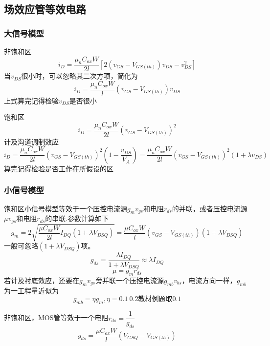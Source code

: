 \documentclass{ctexart}
\begin{document}
\subsection{场效应管等效电路}
\subsubsection{大信号模型}
非饱和区
\begin{equation}
    i_D=\dfrac{\mu_n C_{ox} W}{2l}[2(v_{GS}-V_{GS(th)})v_{DS}-v_{DS}^2]
\end{equation}
当$v_{DS}$很小时，可以忽略其二次方项，简化为
\begin{equation}
    i_D=\dfrac{\mu_n C_{ox} W}{l}(v_{GS}-V_{GS(th)})v_{DS}
\end{equation}
{\color{Red}上式算完记得检验$v_{DS}$是否很小}

饱和区
\begin{equation}
    i_D=\dfrac{\mu_n C_{ox} W}{2l}(v_{GS}-V_{GS(th)})^2
\end{equation}
计及沟道调制效应
\begin{equation}
    i_D=\dfrac{\mu_n C_{ox} W}{2l}(v_{GS}-V_{GS(th)})^2(1-\dfrac{v_{DS}}{V_A})=\dfrac{\mu_n C_{ox} W}{2l}(v_{GS}-V_{GS(th)})^2(1+\lambda{v_{DS}})
\end{equation}
{\color{Red}算完记得检验是否工作在所假设的区}
\subsubsection{小信号模型}
饱和区小信号模型等效于一个压控电流源$g_mv_{gs}$和电阻$r_{ds}$的并联，或者压控电流源$\mu v_{gs}$和电阻$r_{ds}$的串联.参数计算如下
\begin{equation}
    g_m=2\sqrt{\dfrac{\mu C_{ox} W}{2l}I_{DQ}(1+\lambda V_{DSQ})}=\dfrac{\mu C_{ox} W}{l}(v_{GS}-V_{GS(th)})(1+\lambda V_{DSQ})
\end{equation}
一般可忽略$(1+\lambda V_{DSQ})$项。
\begin{equation}
    g_{ds}=\dfrac{\lambda I_{DQ}}{1+\lambda V_{DSQ}}\approx\lambda I_{DQ}
\end{equation}
\begin{equation}
    \mu = g_m r_{ds}
\end{equation}
若计及衬底效应，还要在$g_mv_{gs}$旁并联一个压控电流源$g_{mb}v_{bs}$，电流方向一样，$g_{mb}$为一工程量近似为
\begin{equation}
    g_{mb}=\eta g_m,\eta = 0.1~0.2\text{教材例题取0.1}
\end{equation}

非饱和区，MOS管等效于一个电阻$r_{ds}=\dfrac{1}{g_{ds}}$
\begin{equation}
    g_{ds}=\dfrac{\mu C_{ox} W}{l}(V_{GSQ}-V_{GS(th)})
\end{equation}
\end{document}
